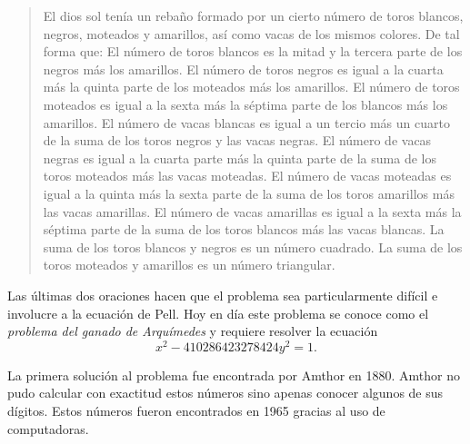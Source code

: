 \begin{quote}
	El dios sol tenía un rebaño formado por un cierto número de toros blancos,
	negros, moteados y amarillos, así como vacas de los mismos colores. De tal
	forma que: El número de toros blancos es la mitad y la tercera parte de los
	negros más los amarillos.  El número de toros negros es igual a la cuarta
	más la quinta parte de los moteados más los amarillos.  El número de toros
	moteados es igual a la sexta más la séptima parte de los blancos más los
	amarillos.  El número de vacas blancas es igual a un tercio más un cuarto
	de la suma de los toros negros y las vacas negras.  El número de vacas
	negras es igual a la cuarta parte más la quinta parte de la suma de los
	toros moteados más las vacas moteadas.  El número de vacas moteadas es
	igual a la quinta más la sexta parte de la suma de los toros amarillos más
	las vacas amarillas.  El número de vacas amarillas es igual a la sexta más
	la séptima parte de la suma de los toros blancos más las vacas blancas. La
	suma de los toros blancos y negros es un número cuadrado.  La suma de los
	toros moteados y amarillos es un número triangular.
\end{quote}

Las últimas dos oraciones hacen que el problema sea particularmente difícil e
involucre a la ecuación de Pell.  Hoy en día este problema se conoce como el
\emph{problema del ganado de Arquímedes} y requiere resolver la ecuación 
\[
	x^2- 410286423278424y^2=1.
\]

La primera solución al problema fue encontrada por Amthor en 1880. Amthor no
pudo calcular con exactitud estos números sino apenas conocer algunos de sus
dígitos. Estos números fueron encontrados en 1965 gracias al uso de
computadoras. 



